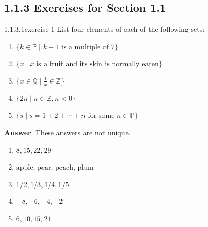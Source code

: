 \documentclass[twoside,10pt,]{book}
\numberwithin{equation}{section}
\begin{document}
\subsection*{1.1.3 Exercises for Section 1.1}
\begin{divisionsolution}{1.1.3.1}{}{exercise-1}%
\hypertarget{p-178}{}%
List four elements of each of the following sets:%
\par
\hypertarget{p-179}{}%
\leavevmode%
\begin{enumerate}[label=(\alph*)]
\item\hypertarget{li-148}{}\hypertarget{p-180}{}%
\(\{k \in  \mathbb{P} \mid {k - 1} \textrm{ is a multiple of 7}\}\)%
\item\hypertarget{li-149}{}\hypertarget{p-181}{}%
\(\{x \mid x \textrm{ is a fruit and its skin is normally eaten}\}\)%
\item\hypertarget{li-150}{}\hypertarget{p-182}{}%
\(\{x \in \mathbb{Q}\mid \frac{1}{x} \in \mathbb{Z}\}\)%
\item\hypertarget{li-151}{}\hypertarget{p-183}{}%
\(\{2n \mid n \in \mathbb{Z}, n < 0 \}\)%
\item\hypertarget{li-152}{}\hypertarget{p-184}{}%
\(\{s \mid s = 1 + 2 + \cdots  + n \textrm{ for some } n \in \mathbb{P}\}\)%
\end{enumerate}
%
\par\smallskip%
\noindent\textbf{Answer}.\quad%
\hypertarget{p-185}{}%
These answers are not unique.%
\par
\hypertarget{p-186}{}%
\leavevmode%
\begin{multicols}{2}
\begin{enumerate}[label=(\alph*)]
\item\hypertarget{li-153}{}\hypertarget{p-187}{}%
\(8, 15, 22, 29\)%
\item\hypertarget{li-154}{}\hypertarget{p-188}{}%
\(\textrm{apple, pear, peach, plum}\)%
\item\hypertarget{li-155}{}\hypertarget{p-189}{}%
\(1/2, 1/3, 1/4, 1/5\)%
\item\hypertarget{li-156}{}\hypertarget{p-190}{}%
\(-8, -6, -4, -2\)%
\item\hypertarget{li-157}{}\hypertarget{p-191}{}%
\(6, 10, 15, 21\)%
\end{enumerate}
\end{multicols}
%
\end{divisionsolution}%
\end{document}
